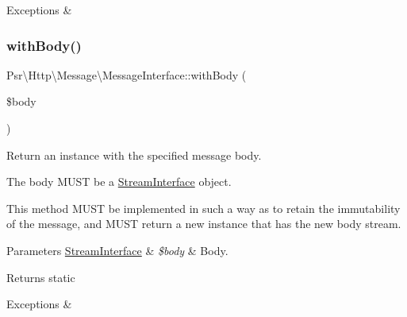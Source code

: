 \begin{DoxyExceptions}{Exceptions}
{\em } & \\
\hline
\end{DoxyExceptions}
\mbox{\label{interfacePsr_1_1Http_1_1Message_1_1MessageInterface_a45af72ddafb601548ea60d0ddd961e65}} 
\subsubsection{\texorpdfstring{with\+Body()}{withBody()}}
{\footnotesize\ttfamily Psr\textbackslash{}\+Http\textbackslash{}\+Message\textbackslash{}\+Message\+Interface\+::with\+Body (\begin{DoxyParamCaption}\item[{\hyperlink{interfacePsr_1_1Http_1_1Message_1_1StreamInterface}{Stream\+Interface}}]{\$body }\end{DoxyParamCaption})}

Return an instance with the specified message body.

The body M\+U\+ST be a \hyperlink{interfacePsr_1_1Http_1_1Message_1_1StreamInterface}{Stream\+Interface} object.

This method M\+U\+ST be implemented in such a way as to retain the immutability of the message, and M\+U\+ST return a new instance that has the new body stream.


\begin{DoxyParams}[1]{Parameters}
\hyperlink{interfacePsr_1_1Http_1_1Message_1_1StreamInterface}{Stream\+Interface} & {\em \$body} & Body. \\
\hline
\end{DoxyParams}
\begin{DoxyReturn}{Returns}
static 
\end{DoxyReturn}

\begin{DoxyExceptions}{Exceptions}
{\em } & \\
\hline
\end{DoxyExceptions}
\mbox{\label{interfacePsr_1_1Http_1_1Message_1_1MessageInterface_a4648889c9007ddb25adf65ef4cb2a612}} 
